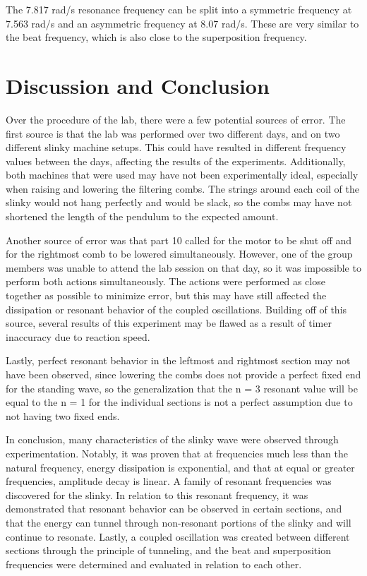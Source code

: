 \documentclass[12pt, letterpaper, twoside]{article}
\begin{document}
The 7.817 rad/s resonance frequency can be split into a symmetric frequency at 7.563 rad/s and an asymmetric frequency at 8.07 rad/s. 
These are very similar to the beat frequency, which is also close to the superposition frequency.

\section{Discussion and Conclusion}

Over the procedure of the lab, there were a few potential sources of error. The first source is that the lab was performed over two different days, and on two different slinky machine setups. This could have resulted in different frequency values between the days, affecting the results of the experiments. Additionally, both machines that were used may have not been experimentally ideal, especially when raising and lowering the filtering combs. The strings around each coil of the slinky would not hang perfectly and would be slack, so the combs may have not shortened the length of the pendulum to the expected amount. 

Another source of error was that part 10 called for the motor to be shut off and for the rightmost comb to be lowered simultaneously. However, one of the group members was unable to attend the lab session on that day, so it was impossible to perform both actions simultaneously. The actions were performed as close together as possible to minimize error, but this may have still affected the dissipation or resonant behavior of the coupled oscillations. Building off of this source, several results of this experiment may be flawed as a result of timer inaccuracy due to reaction speed. 

Lastly, perfect resonant behavior in the leftmost and rightmost section may not have been observed, since lowering the combs does not provide a perfect fixed end for the standing wave, so the generalization that the n = 3 resonant value will be equal to the n = 1 for the individual sections is not a perfect assumption due to not having two fixed ends.

In conclusion, many characteristics of the slinky wave were observed through experimentation. Notably, it was proven that at frequencies much less than the natural frequency, energy dissipation is exponential, and that at equal or greater frequencies, amplitude decay is linear. A family of resonant frequencies was discovered for the slinky. In relation to this resonant frequency, it was demonstrated that resonant behavior can be observed in certain sections, and that the energy can tunnel through non-resonant portions of the slinky and will continue to resonate. Lastly, a coupled oscillation was created between different sections through the principle of tunneling, and the beat and superposition frequencies were determined and evaluated in relation to each other.
\end{document}
